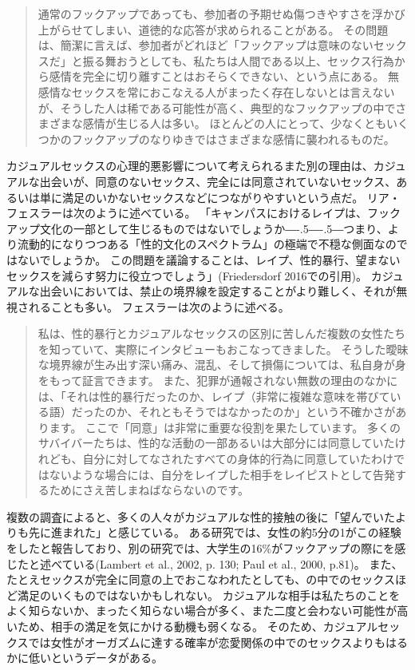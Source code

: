 \documentclass[paper=a4,book,openany]{jlreq}
\def\DDASH{―\kern-.5\zw―\kern-.5\zw―}
\begin{document}
\begin{quote}
 通常のフックアップであっても、参加者の予期せぬ傷つきやすさを浮かび上がらせてしまい、道徳的な応答が求められることがある。
その問題は、簡潔に言えば、参加者がどれほど「フックアップは意味のないセックスだ」と振る舞おうとしても、私たちは人間である以上、セックス行為から感情を完全に切り離すことはおそらくできない、という点にある。
無感情なセックスを常におこなえる人がまったく存在しないとは言えないが、そうした人は稀である可能性が高く、典型的なフックアップの中でさまざまな感情が生じる人は多い。
ほとんどの人にとって、少なくともいくつかのフックアップのなりゆきではさまざまな感情に襲われるものだ。
\citep[Chapter 7]{rocha19}
\end{quote}

カジュアルセックスの心理的悪影響について考えられるまた別の理由は、カジュアルな出会いが、同意のないセックス、完全には同意されていないセックス、あるいは単に満足のいかないセックスなどにつながりやすいという点だ。
リア・フェスラーは次のように述べている。
「キャンパスにおけるレイプは、フックアップ文化の一部として生じるものではないでしょうか{\DDASH}つまり、より流動的になりつつある「性的文化のスペクトラム」の極端で不穏な側面なのではないでしょうか。
この問題を議論することは、レイプ、性的暴行、望まないセックスを減らす努力に役立つでしょう」(Friedersdorf 2016での引用)\nocite{friedersdorf16:_how_does_hook}。
カジュアルな出会いにおいては、禁止の境界線を設定することがより難しく、それが無視されることも多い。
フェスラーは次のように述べる。

\begin{quote}
 私は、性的暴行とカジュアルなセックスの区別に苦しんだ複数の女性たちを知っていて、実際にインタビューもおこなってきました。
そうした曖昧な境界線が生み出す深い痛み、混乱、そして損傷については、私自身が身をもって証言できます。
また、犯罪が通報されない無数の理由のなかには、「それは性的暴行だったのか、レイプ（非常に複雑な意味を帯びている語）だったのか、それともそうではなかったのか」という不確かさがあります。
ここで「同意」は非常に重要な役割を果たしています。
多くのサバイバーたちは、性的な活動の一部あるいは大部分には同意していたけれども、自分に対してなされたすべての身体的行為に同意していたわけではないような場合には、自分をレイプした相手をレイピストとして告発するためにさえ苦しまねばならないのです。
\citep{friedersdorf16:_how_does_hook}
\end{quote}

複数の調査によると、多くの人々がカジュアルな性的接触の後に「望んでいたよりも先に進まれた」と感じている。
ある研究では、女性の約5分の1がこの経験をしたと報告しており、別の研究では、大学生の16\%がフックアップの際にを感じたと述べている(Lambert et al., 2002, p. 130; Paul et al., 2000, p.81)。
\nocite{lambert02:_plur_ignor_hook_up}\nocite{paul00:_hook}
また、たとえセックスが完全に同意の上でおこなわれたとしても、の中でのセックスほど満足のいくものではないかもしれない。
カジュアルな相手は私たちのことをよく知らないか、まったく知らない場合が多く、また二度と会わない可能性が高いため、相手の満足を気にかける動機も弱くなる。
そのため、カジュアルセックスでは女性がオーガズムに達する確率が恋愛関係の中でのセックスよりもはるかに低いというデータがある\citep{armstrong10:_orgas_coll_hook_relat}。
\end{document}
